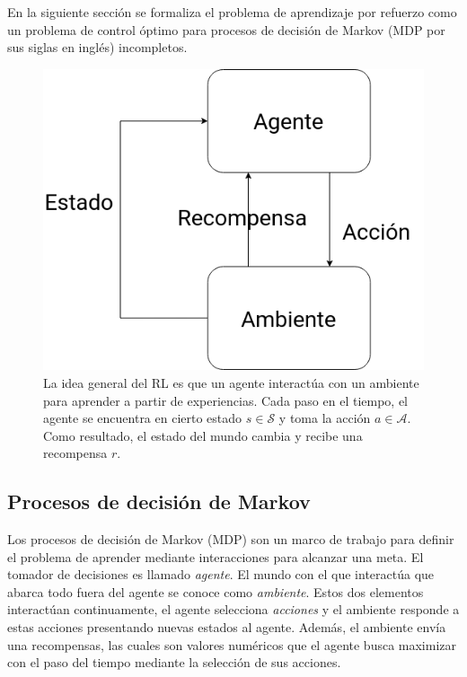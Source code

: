 En la siguiente sección se formaliza el problema de aprendizaje por refuerzo como
un problema de control óptimo para procesos de decisión de Markov (MDP por sus siglas en inglés) incompletos.

\begin{figure}
    \centering
    \includegraphics[scale=0.25]{Chapter2/Figs/agend_interaction.png}
    \caption{La idea general del RL es que un agente interactúa con un ambiente para
    aprender a partir de experiencias. Cada paso en el tiempo, el agente se encuentra
    en cierto estado $s\in \mathcal{S}$ y toma la acción $a \in \mathcal{A}$. Como
    resultado, el estado del mundo cambia y recibe una recompensa $r$.}
\end{figure}

\subsection{Procesos de decisión de Markov}


Los procesos de decisión de Markov (MDP) son un marco de trabajo para
definir el problema de aprender
mediante interacciones para 
alcanzar una meta. El tomador de 
decisiones es llamado \textit{agente}.
El mundo con el que interactúa que
abarca todo fuera del agente se 
conoce como \textit{ambiente}.
Estos dos elementos
interactúan continuamente, el agente
selecciona \textit{acciones} y
el ambiente responde a estas 
acciones presentando nuevas 
estados al agente. Además,
el ambiente envía una recompensas,
las cuales son valores numéricos 
que el agente busca maximizar con
el paso del tiempo mediante la 
selección de sus acciones.

